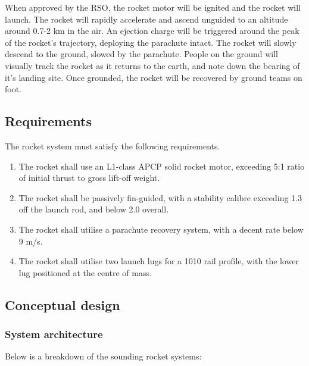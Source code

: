 \documentclass{article}
\begin{document}
        When approved by the RSO, the rocket motor will be ignited and the rocket will launch. The rocket will rapidly accelerate and ascend unguided to an altitude around 0.7-2 km in the air.
        An ejection charge will be triggered around the peak of the rocket's trajectory, deploying the parachute intact. The rocket will slowly descend to the ground, slowed by the parachute.
        People on the ground will visually track the rocket as it returns to the earth, and note down the bearing of it's landing site. Once grounded, the rocket will be recovered by ground teams on foot.

    \subsection{Requirements}

        The rocket system must satisfy the following requirements.
        
        \begin{enumerate}
            \item The rocket shall use an L1-class APCP solid rocket motor, exceeding 5:1 ratio of initial thrust to gross lift-off weight.
            \item The rocket shall be passively fin-guided, with a stability calibre exceeding 1.3 off the launch rod, and below 2.0 overall.
            \item The rocket shall utilise a parachute recovery system, with a decent rate below 9 m/s.
            \item The rocket shall utilise two launch lugs for a 1010 rail profile, with the lower lug positioned at the centre of mass.
        \end{enumerate}

    \subsection{Conceptual design}
    
        \subsubsection{System architecture}

            Below is a breakdown of the sounding rocket systems:
\end{document}
